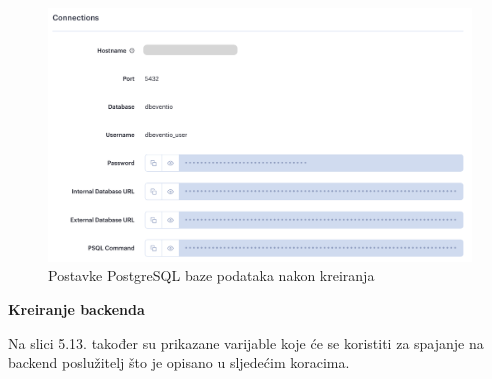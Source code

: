 			\begin{figure}[H]
				\includegraphics[scale=0.45]{deploy/baza.png}
				\centering
				\caption{Postavke PostgreSQL baze podataka nakon kreiranja}
				\label{fig:promjene}
			\end{figure}
			
			\textbf{Kreiranje backenda}
			
			Na slici 5.13. također su prikazane varijable koje će se koristiti za spajanje na backend poslužitelj što je opisano u sljedećim koracima.
			
